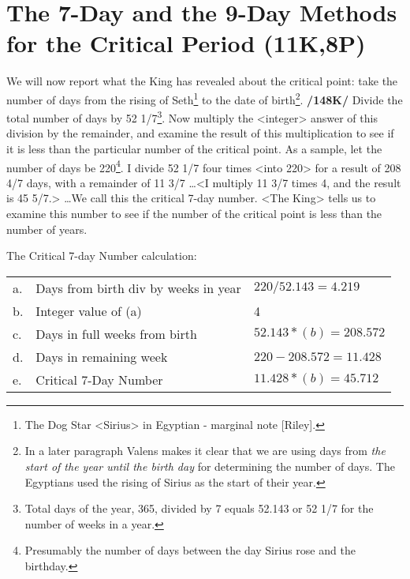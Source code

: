 \section{The 7-Day and the 9-Day Methods for the Critical Period (11K,8P)}
We will now report what the King has revealed about the critical point: take the number of days from the rising of Seth\footnote{The Dog Star <Sirius> in Egyptian - marginal note [Riley].} to the date of birth\footnote{In a later paragraph Valens makes it clear that we are using days from \textsl{the start of the year until the birth day} for determining the number of days. The Egyptians used the rising of Sirius as the start of their year.}. \textbf{/148K/} Divide the total number of days by 52 1/7\footnote{Total days of the year, 365, divided by 7 equals  52.143 or 52 1/7 for the number of weeks in a year.}. Now multiply the <integer> answer of this division by the remainder, and examine the result of this multiplication to see if it is less than the particular number of the critical point. As a sample, let the number of days be 220\footnote{Presumably the number of days between the day Sirius rose and the birthday.}. I divide 52 1/7 four times <into 220> for a result of 208 4/7 days, with a remainder of 11 3/7 \ldots <I multiply 11 3/7 times 4, and the result is 45 5/7.> \ldots We call this the critical 7-day number.
<The King> tells us to examine this number to see if the number of the critical point is less than the number of years. 

\begin{mdframed}[backgroundcolor=cyan!5]
\tiny
The Critical 7-day Number calculation:
\begin{longtable}[h]{l l l}
a. & Days from birth div by weeks in year &
		$220 / 52.143 = 4.219$		\\
b. & Integer value of (a) & 4 \\		
c. & Days in full weeks from birth & $52.143 * (b) = 208.572$		 \\
d. & Days in remaining week & $220 - 208.572 = 11.428$	\\
e. & Critical 7-Day Number & $11.428 * (b) = 45.712$		\\
\end{longtable}
\end{mdframed}

